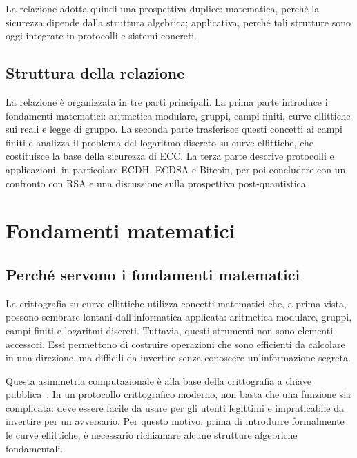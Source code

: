 \documentclass[12pt,a4paper,oneside]{report}
\begin{document}
La relazione adotta quindi una prospettiva duplice: matematica, perché la sicurezza dipende dalla struttura algebrica; applicativa, perché tali strutture sono oggi integrate in protocolli e sistemi concreti.

\section{Struttura della relazione}

La relazione è organizzata in tre parti principali. La prima parte introduce i fondamenti matematici: aritmetica modulare, gruppi, campi finiti, curve ellittiche sui reali e legge di gruppo. La seconda parte trasferisce questi concetti ai campi finiti e analizza il problema del logaritmo discreto su curve ellittiche, che costituisce la base della sicurezza di ECC. La terza parte descrive protocolli e applicazioni, in particolare ECDH, ECDSA e Bitcoin, per poi concludere con un confronto con RSA e una discussione sulla prospettiva post-quantistica.

\chapter{Fondamenti matematici}

\section{Perché servono i fondamenti matematici}

La crittografia su curve ellittiche utilizza concetti matematici che, a prima vista, possono sembrare lontani dall'informatica applicata: aritmetica modulare, gruppi, campi finiti e logaritmi discreti. Tuttavia, questi strumenti non sono elementi accessori. Essi permettono di costruire operazioni che sono efficienti da calcolare in una direzione, ma difficili da invertire senza conoscere un'informazione segreta.

Questa asimmetria computazionale è alla base della crittografia a chiave pubblica~\cite{margara_complessita,margara_publickey}. In un protocollo crittografico moderno, non basta che una funzione sia complicata: deve essere facile da usare per gli utenti legittimi e impraticabile da invertire per un avversario. Per questo motivo, prima di introdurre formalmente le curve ellittiche, è necessario richiamare alcune strutture algebriche fondamentali.
\end{document}

